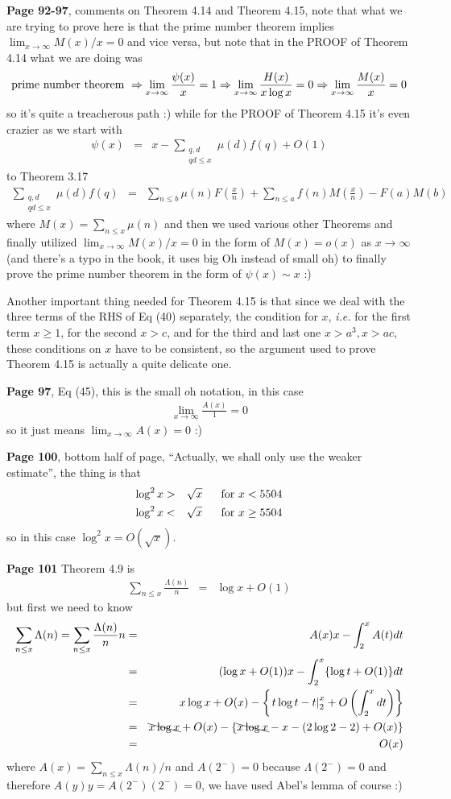\documentclass[aps,preprint,preprintnumbers,nofootinbib,showpacs,prd]{revtex4-1}
\newcommand{\ie}{{\it i.e.} }
\newcommand{\nbea}{\begin{eqnarray*}}
\newcommand{\neea}{\end{eqnarray*}}
\begin{document}
{\bf Page 92-97}, comments on Theorem 4.14 and Theorem 4.15, note that what we are trying to prove here is that the prime number theorem implies $\lim_{x\to\infty} M(x)/x = 0$ and vice versa, but note that in the PROOF of Theorem 4.14 what we are doing was
%
\nbea
{\rm prime~number~theorem~} \Rightarrow \lim_{x\to\infty}\frac{\psi(x)}{x} = 1 \Rightarrow \lim_{x\to\infty}\frac{H(x)}{x\log x} = 0 \Rightarrow \lim_{x\to\infty}\frac{M(x)}{x} = 0
\neea
%
so it's quite a treacherous path :) while for the PROOF of Theorem 4.15 it's even crazier as we start with
%
\nbea
\psi(x) & = & x - \sum_{\substack{q,d\\ qd\le x}}\mu(d)f(q)  + O(1)
\neea
%
to Theorem 3.17
%
\nbea
\sum_{\substack{q,d\\ qd\le x}}\mu(d)f(q) & = & \sum_{n\le b}\mu(n)F\left ( \frac{x}{n}\right ) + \sum_{n\le a} f(n)M\left(\frac{x}{n}\right) - F(a)M(b)
\neea
%
where $M(x) = \sum_{n\le x}\mu(n)$ and then we used various other Theorems and finally utilized $\lim_{x\to\infty} M(x)/x = 0$ in the form of $M(x) = o(x)$ as $x\to\infty$ (and there's a typo in the book, it uses big Oh instead of small oh) to finally prove the prime number theorem in the form of $\psi(x) \sim x$ :)

Another important thing needed for Theorem 4.15 is that since we deal with the three terms of the RHS of Eq (40) separately, the condition for $x$, \ie for the first term $x\ge1$, for the second $x>c$, and for the third and last one $x> a^3, x > ac$, these conditions on $x$ have to be consistent, so the argument used to prove Theorem 4.15 is actually a quite delicate one.

{\bf Page 97}, Eq (45), this is the small $o$h notation, in this case
%
\nbea
\lim_{x\to\infty} \frac{A(x)}{1} = 0
\neea
%
so it just means $\lim_{x\to\infty}A(x) = 0$ :)

{\bf Page 100}, bottom half of page, ``Actually, we shall only use the weaker estimate'', the thing is that
%
\nbea
\log^2 x & > & \sqrt{x} ~~~~~ {\rm for~} x < 5504 \\
\log^2 x & < & \sqrt{x} ~~~~~ {\rm for~} x \ge 5504
\neea
%
so in this case $\log^2 x = O(\sqrt{x})$.

{\bf Page 101} Theorem 4.9 is
%
\nbea
\sum_{n\le x}\frac{\Lambda(n)}{n} & = & \log x + O(1)
\neea
%
but first we need to know
%
\nbea
\sum_{n\le x} \Lambda(n) = \sum_{n\le x}\frac{\Lambda(n)}{n} n & = & A(x)x - \int_2^xA(t)dt \\
& = & (\log x + O(1))x - \int_2^x \{\log t + O(1)\}dt \\
& = & x\log x + O(x) - \left \{ \left.t\log t - t\right|_2^x + O\left(\int_2^x dt\right) \right \} \\
& = & \bcancel{x\log x} + O(x) - \left\{ \bcancel{x\log x} - x - (2\log 2 - 2) + O(x) \right\} \\
& = & O(x)
\neea
%
where $A(x) = \sum_{n\le x}\Lambda(n)/n$ and $A(2^-) = 0$ because $\Lambda(2^-) = 0$ and therefore $A(y)y = A(2^-)(2^-) = 0$, we have used Abel's lemma of course :)
\end{document}
